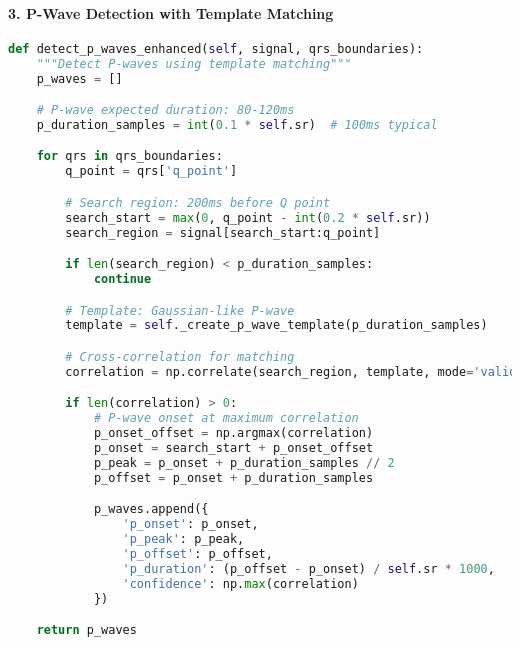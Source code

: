 \documentclass[11pt]{article}
\begin{document}
\paragraph{3. P-Wave Detection with Template Matching}
\begin{lstlisting}[language=Python, caption=P-Wave Detection]
def detect_p_waves_enhanced(self, signal, qrs_boundaries):
    """Detect P-waves using template matching"""
    p_waves = []

    # P-wave expected duration: 80-120ms
    p_duration_samples = int(0.1 * self.sr)  # 100ms typical

    for qrs in qrs_boundaries:
        q_point = qrs['q_point']

        # Search region: 200ms before Q point
        search_start = max(0, q_point - int(0.2 * self.sr))
        search_region = signal[search_start:q_point]

        if len(search_region) < p_duration_samples:
            continue

        # Template: Gaussian-like P-wave
        template = self._create_p_wave_template(p_duration_samples)

        # Cross-correlation for matching
        correlation = np.correlate(search_region, template, mode='valid')

        if len(correlation) > 0:
            # P-wave onset at maximum correlation
            p_onset_offset = np.argmax(correlation)
            p_onset = search_start + p_onset_offset
            p_peak = p_onset + p_duration_samples // 2
            p_offset = p_onset + p_duration_samples

            p_waves.append({
                'p_onset': p_onset,
                'p_peak': p_peak,
                'p_offset': p_offset,
                'p_duration': (p_offset - p_onset) / self.sr * 1000,
                'confidence': np.max(correlation)
            })

    return p_waves
\end{lstlisting}
\end{document}
